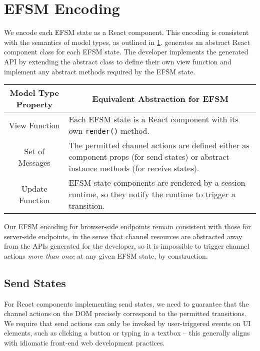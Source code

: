 \section{EFSM Encoding}
\label{section:reactefsm}

We encode each EFSM state as a React component.
This encoding is consistent with the semantics of model types,
as outlined in \cref{table:efsmmodeltypes}.
 generates an abstract React component class
for each EFSM state. The developer implements the generated API
by extending the abstract class to define their own
view function and implement any abstract methods
required by the EFSM state.

\renewcommand{\arraystretch}{1.5}
\begin{table}[!ht]
\centering
\begin{tabularx}{\linewidth}{||c|X||}
\hline
Model Type Property & \multicolumn{1}{c||}{Equivalent Abstraction for EFSM} \\
\hline\hline
View Function & 
Each EFSM state is a React component 
with its own \texttt{render()} method. \\ 
\hline
Set of Messages & The permitted channel actions are defined either as 
component props (for send states) 
or abstract instance methods (for receive states). \\
\hline
Update Function & EFSM state components are rendered by a session runtime,
so they notify the runtime to trigger a transition. \\
\hline
\end{tabularx}
\label{table:efsmmodeltypes}
\end{table}
\renewcommand{\arraystretch}{1}

Our EFSM encoding for browser-side endpoints remain
consistent with those for server-side endpoints, in the sense that
channel resources are abstracted away from the APIs generated
for the developer, so it is impossible to trigger
channel actions \textit{more than once} at any given EFSM state,
by construction.

\subsection{Send States}

For React components implementing send states,
we need to guarantee that the channel actions on the DOM
precisely correspond to the permitted transitions.
We require that send actions can only be invoked
by user-triggered events on UI elements, such as clicking a button or
typing in a textbox -- this generally aligns
with idiomatic front-end web development practices.

